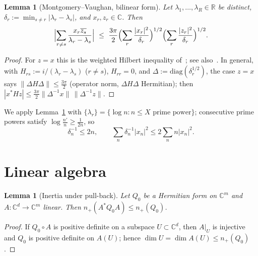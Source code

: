 \documentclass[11pt]{amsart}
\newtheorem{lemma}[theorem]{Lemma}
\theoremstyle{definition}
\theoremstyle{remark}
\numberwithin{equation}{section}
\newcommand{\RR}{\mathbb{R}}
\newcommand{\CC}{\mathbb{C}}
\newcommand{\ol}{\overline}
\newcommand{\npl}{n_{+}}
\begin{document}
\begin{lemma}[Montgomery--Vaughan, bilinear form]\label{lem:MV}
Let $\lambda_1,\dots,\lambda_R\in\RR$ be distinct, $\delta_r:=\min_{s\ne r}|\lambda_r-\lambda_s|$, and $x_r,z_r\in\CC$. Then
\[
\Bigl|\sum_{r\ne s}\frac{x_r\ol{z_s}}{\lambda_r-\lambda_s}\Bigr|\ \le\ \frac{3\pi}2\Bigl(\sum_r\frac{|x_r|^2}{\delta_r}\Bigr)^{1/2}\Bigl(\sum_r\frac{|z_r|^2}{\delta_r}\Bigr)^{1/2}.
\]
\end{lemma}
\begin{proof}
For $z=x$ this is the weighted Hilbert inequality of~\cite[Theorem~2]{MV74}; see also~\cite[Ch.~7]{Mon94}. In general, with $H_{rs}:=i/(\lambda_r-\lambda_s)$ ($r\ne s$), $H_{rr}=0$, and $\Delta:=\mathrm{diag}(\delta_r^{1/2})$, the case $z=x$ says $\|\Delta H\Delta\|\le\tfrac{3\pi}2$ (operator norm, $\Delta H\Delta$ Hermitian); then $|x^*Hz|\le\tfrac{3\pi}2\|\Delta^{-1}x\|\,\|\Delta^{-1}z\|$.
\end{proof}

We apply Lemma~\ref{lem:MV} with $\{\lambda_r\}=\{\log n:n\le X\text{ prime power}\}$; consecutive prime powers satisfy $\log\tfrac{n'}n\ge\tfrac1{2n}$, so
\begin{equation}\label{eq:deltan}
\delta_n^{-1}\le2n,\qquad \sum_n\delta_n^{-1}|x_n|^2\le2\sum_n n|x_n|^2.
\end{equation}

\section{Linear algebra}\label{sec:linalg}

\begin{lemma}[Inertia under pull-back]\label{lem:inertia}
Let $Q_0$ be a Hermitian form on $\CC^m$ and $A\colon\CC^d\to\CC^m$ linear. Then $\npl(A^*Q_0A)\le\npl(Q_0)$.
\end{lemma}
\begin{proof}
If $Q_0\circ A$ is positive definite on a subspace $U\subset\CC^d$, then $A|_U$ is injective and $Q_0$ is positive definite on $A(U)$; hence $\dim U=\dim A(U)\le\npl(Q_0)$.
\end{proof}
\end{document}
